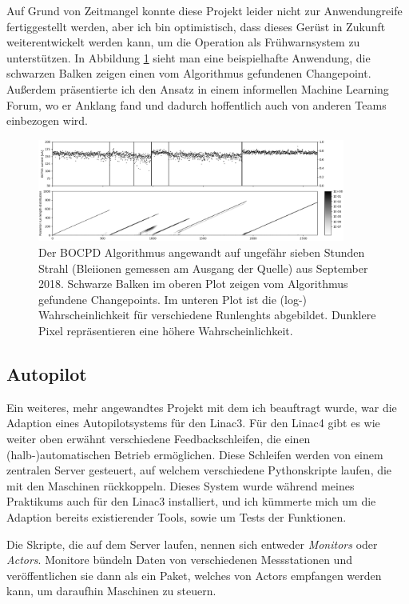 \documentclass[11pt, a4paper, titlepage, headings=standardclasses]{scrartcl}
\begin{document}
Auf Grund von Zeitmangel konnte diese Projekt leider nicht zur Anwendungreife fertiggestellt werden, aber ich bin optimistisch, dass dieses Gerüst in Zukunft weiterentwickelt werden kann, um die Operation als Frühwarnsystem zu unterstützen. In Abbildung \ref{fig:bocd} sieht man eine beispielhafte Anwendung, die schwarzen Balken zeigen einen vom Algorithmus gefundenen Changepoint. Außerdem präsentierte ich den Ansatz in einem informellen Machine Learning Forum, wo er Anklang fand und dadurch hoffentlich auch von anderen Teams einbezogen wird.

\begin{figure}
    \centering
    \includegraphics[width=0.9\textwidth]{bocd_example.png}
    \caption{Der BOCPD Algorithmus angewandt auf ungefähr sieben Stunden Strahl (Bleiionen gemessen am Ausgang der Quelle) aus September 2018. Schwarze Balken im oberen Plot zeigen vom Algorithmus gefundene Changepoints. Im unteren Plot ist die (log-) Wahrscheinlichkeit für verschiedene Runlenghts abgebildet. Dunklere Pixel repräsentieren eine höhere Wahrscheinlichkeit.}
    \label{fig:bocd}
\end{figure}

\subsection*{Autopilot}

Ein weiteres, mehr angewandtes Projekt mit dem ich beauftragt wurde, war die Adaption eines Autopilotsystems für den Linac3. Für den Linac4 gibt es wie weiter oben erwähnt verschiedene Feedbackschleifen, die einen (halb-)automatischen Betrieb ermöglichen. Diese Schleifen werden von einem zentralen Server gesteuert, auf welchem verschiedene Pythonskripte laufen, die mit den Maschinen rückkoppeln. Dieses System wurde während meines Praktikums auch für den Linac3 installiert, und ich kümmerte mich um die Adaption bereits existierender Tools, sowie um Tests der Funktionen.

Die Skripte, die auf dem Server laufen, nennen sich entweder \textit{Monitors} oder \textit{Actors}. Monitore bündeln Daten von verschiedenen Messstationen und veröffentlichen sie dann als ein Paket, welches von Actors empfangen werden kann, um daraufhin Maschinen zu steuern. 
\end{document}
